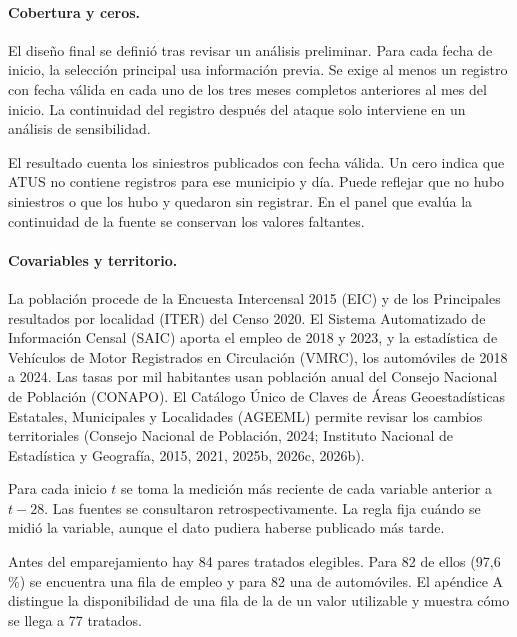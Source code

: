\documentclass[11pt,letterpaper]{article}
\begin{document}
\paragraph{Cobertura y ceros.}

El diseño final se definió tras revisar un análisis preliminar. Para cada fecha de inicio, la selección principal usa información previa. Se exige al menos un registro con fecha válida en cada uno de los tres meses completos anteriores al mes del inicio. La continuidad del registro después del ataque solo interviene en un análisis de sensibilidad.\par

El resultado cuenta los siniestros publicados con fecha válida. Un cero indica que ATUS no contiene registros para ese municipio y día. Puede reflejar que no hubo siniestros o que los hubo y quedaron sin registrar. En el panel que evalúa la continuidad de la fuente se conservan los valores faltantes.\par

\paragraph{Covariables y territorio.}

La población procede de la Encuesta Intercensal 2015 (EIC) y de los Principales resultados por localidad (ITER) del Censo 2020. El Sistema Automatizado de Información Censal (SAIC) aporta el empleo de 2018 y 2023, y la estadística de Vehículos de Motor Registrados en Circulación (VMRC), los automóviles de 2018 a 2024. Las tasas por mil habitantes usan población anual del Consejo Nacional de Población (CONAPO). El Catálogo Único de Claves de Áreas Geoestadísticas Estatales, Municipales y Localidades (AGEEML) permite revisar los cambios territoriales (Consejo Nacional de Población, 2024; Instituto Nacional de Estadística y Geografía, 2015, 2021, 2025b, 2026c, 2026b).\par

Para cada inicio $t$ se toma la medición más reciente de cada variable anterior a $t-28$. Las fuentes se consultaron retrospectivamente. La regla fija cuándo se midió la variable, aunque el dato pudiera haberse publicado más tarde.\par

Antes del emparejamiento hay 84 pares tratados elegibles. Para 82 de ellos (97,6 \%) se encuentra una fila de empleo y para 82 una de automóviles. El apéndice A distingue la disponibilidad de una fila de la de un valor utilizable y muestra cómo se llega a 77 tratados.\par
\end{document}
